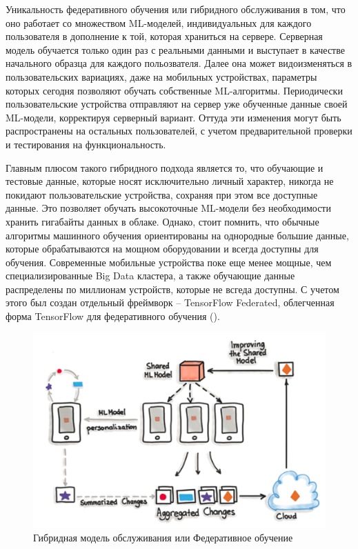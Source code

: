 \documentclass[%
	11pt,
	a4paper,
	utf8,
		]{article}
\begin{document}
Уникальность федеративного обучения или гибридного обслуживания в том, что оно работает со множеством ML-моделей, индивидуальных для каждого пользователя в дополнение к той, которая храниться на сервере. Серверная модель обучается только один раз с реальными данными и выступает в качестве начального образца для каждого польозвателя. Далее она может видоизменяться в пользовательских вариациях, даже на мобильных устройствах, параметры которых сегодня позволяют обучать собственные ML-алгоритмы. Периодически пользовательские устройства отправляют на сервер уже обученные данные своей ML-модели, корректируя серверный вариант. Оттуда эти изменения могут быть распространены на остальных пользователей, с учетом предварительной проверки и тестирования на функциональность.

Главным плюсом такого гибридного подхода является то, что обучающие и тестовые данные, которые носят исключительно личный характер, никогда не покидают пользовательские устройства, сохраняя при этом все доступные данные. Это позволяет обучать высокоточные ML-модели без необходимости хранить гигабайты данных в облаке. Однако, стоит помнить, что обычные алгоритмы машинного обучения ориентированы на однородные большие данные, которые обрабатываются на мощном оборудовании и всегда доступны для обучения. Современные мобильные устройства поке еще менее мощные, чем специализированные Big Data кластера, а также обучающие данные распределены по миллионам устройств, которые не всгеда доступны. С учетом этого был создан отдельный фреймворк -- TensorFlow Federated, облегченная форма TensorFlow для федеративного обучения ().

 \begin{figure}[h]
	\centering
	\includegraphics[scale=0.6]{figures/hybrid_model_serving.png}
	\caption{ Гибридная модель обслуживания или Федеративное обучение }\label{fig:hybrid_model_serving}
\end{figure}
\end{document}
